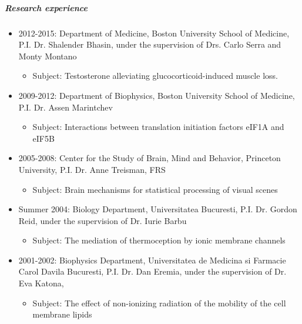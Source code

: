 \documentclass[12pt,english]{report}\usepackage[]{graphicx}\usepackage[]{color}
\begin{document}
\subparagraph*{Research experience}
\begin{itemize}
\item 2012-2015: Department of Medicine, Boston University School of Medicine,
P.I. Dr. Shalender Bhasin, under the supervision of Drs. Carlo Serra
and Monty Montano

\begin{itemize}
\item Subject: Testosterone alleviating glucocorticoid-induced muscle loss.
\end{itemize}
\item 2009-2012: Department of Biophysics, Boston University School of Medicine,
P.I. Dr. Assen Marintchev

\begin{itemize}
\item Subject: Interactions between translation initiation factors eIF1A
and eIF5B
\end{itemize}
\item 2005-2008: Center for the Study of Brain, Mind and Behavior, Princeton
University, P.I. Dr. Anne Treisman, FRS

\begin{itemize}
\item Subject: Brain mechanisms for statistical processing of visual scenes
\end{itemize}
\item Summer 2004: Biology Department, Universitatea Bucuresti, P.I. Dr.
Gordon Reid, under the supervision of Dr. Iurie Barbu

\begin{itemize}
\item Subject: The mediation of thermoception by ionic membrane channels
\end{itemize}
\item 2001-2002: Biophysics Department, Universitatea de Medicina si Farmacie
Carol Davila Bucuresti, P.I. Dr. Dan Eremia, under the supervision
of Dr. Eva Katona, 

\begin{itemize}
\item Subject: The effect of non-ionizing radiation of the mobility of the
cell membrane lipids
\end{itemize}
\end{itemize}
\end{document}
